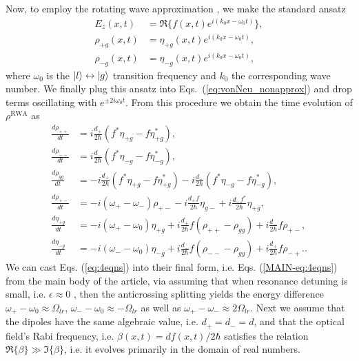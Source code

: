 \documentclass[preprint,secnumarabic,amssymb, nobibnotes, aip, prd]{revtex4-1}
\begin{document}
Now, to employ the rotating wave approximation \cite{weiner2011ultrafast}, we make the standard ansatz 
\begin{align}
E_z(x,t) &= \Re\{f(x,t)e^{i(k_0x-\omega_0t)}\}, \\
\rho_{+g}(x,t) &= \eta_{+g}(x,t)e^{i(k_0x-\omega_0t)}, \\
\rho_{-g}(x,t) &= \eta_{-g}(x,t)e^{i(k_0x-\omega_0t)},
\end{align}
where $\omega_0$ is the $\ket{l}\leftrightarrow\ket{g}$ transition frequency and $k_0$ the corresponding wave number.  We finally plug this ansatz into Eqs.~(\ref{eq:vonNeu_nonapprox}) and drop terms oscillating with $e^{\pm 2i\omega_0t}$. From this procedure we obtain the time evolution of $\rho^{\text{RWA}}$ as
\begin{subequations}
\label{eq:4eqns}
\begin{align}
\frac{d \rho_{++}}{dt} &= i\frac{d_{+}}{2\hbar}(f^*\eta_{+g}-f\eta_{+g}^*), \\
\frac{d \rho_{--}}{dt} &= i\frac{d_{-}}{2\hbar}(f^*\eta_{-g}-f\eta_{-g}^*), \\
\frac{d \rho_{gg}}{dt} &= - i\frac{d_{+}}{2\hbar}(f^*\eta_{+g}-f\eta_{+g}^*)-i\frac{d_{-}}{2\hbar}(f^*\eta_{-g}-f\eta_{-g}^*), \\
\frac{d \rho_{+-}}{dt} &= -i(\omega_+-\omega_-)\rho_{+-}-i\frac{d_{+}f}{2\hbar}\eta_{g-}+i\frac{d_{-}f^*}{2\hbar}\eta_{+g},\\
\frac{d \eta_{+g}}{dt} &= -i(\omega_+-\omega_{0})\eta_{+g}+i\frac{d_{+}}{2\hbar}f(\rho_{++}-\rho_{gg})+i\frac{d_{-}}{2\hbar}f\rho_{+-}, \label{eq:eta+g}\\
\frac{d \eta_{-g}}{dt} &= -i(\omega_--\omega_{0})\eta_{-g}+i\frac{d_{-}}{2\hbar}f(\rho_{--}-\rho_{gg})+i\frac{d_{+}}{2\hbar}f\rho_{-+}. \label{eq:eta-g}. 
\end{align}
\end{subequations}
We can cast Eqs. (\ref{eq:4eqns}) into their final form, i.e. Eqs. (\ref{MAIN-eq:4eqns}) from the main body of the article, via assuming that when resonance detuning is small, i.e. $\epsilon \approx  0$ , then the anticrossing splitting yields the energy difference $\omega_+-\omega_0 \approx \Omega_{lr}$, $\omega_--\omega_0\approx - \Omega_{lr}$ as well as $\omega_+-\omega_- \approx 2\Omega_{lr}$. Next we assume that the dipoles have the same algebraic value, i.e. $d_+ = d_- =d$, and that the optical field's Rabi frequency, i.e. $\beta(x,t) = df(x,t)/2\hbar $ satisfies the relation $\Re\{\beta\} \gg \Im\{\beta\}$, i.e. it evolves primarily in the domain of real numbers. 
\end{document}
